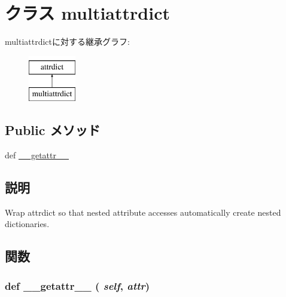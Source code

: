 \hypertarget{classm5_1_1util_1_1attrdict_1_1multiattrdict}{
\section{クラス multiattrdict}
\label{classm5_1_1util_1_1attrdict_1_1multiattrdict}
}
multiattrdictに対する継承グラフ:\begin{figure}[H]
\begin{center}
\leavevmode
\includegraphics[height=2cm]{classm5_1_1util_1_1attrdict_1_1multiattrdict}
\end{center}
\end{figure}
\subsection*{Public メソッド}
\begin{DoxyCompactItemize}
\item 
def \hyperlink{classm5_1_1util_1_1attrdict_1_1multiattrdict_a0a990b3ec3889d40889daca9ee5e4695}{\_\-\_\-getattr\_\-\_\-}
\end{DoxyCompactItemize}


\subsection{説明}
\begin{DoxyVerb}Wrap attrdict so that nested attribute accesses automatically create
nested dictionaries.\end{DoxyVerb}
 

\subsection{関数}
\hypertarget{classm5_1_1util_1_1attrdict_1_1multiattrdict_a0a990b3ec3889d40889daca9ee5e4695}{
\subsubsection[{\_\-\_\-getattr\_\-\_\-}]{\setlength{\rightskip}{0pt plus 5cm}def \_\-\_\-getattr\_\-\_\- ( {\em self}, \/   {\em attr})}}
\label{classm5_1_1util_1_1attrdict_1_1multiattrdict_a0a990b3ec3889d40889daca9ee5e4695}


